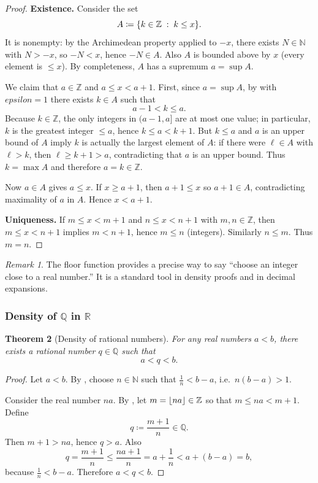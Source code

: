 \documentclass[12pt]{article}
\numberwithin{equation}{section}
\def\eps{epsilon}
\newcommand{\RR}{\mathbb{R}}
\newcommand{\QQ}{\mathbb{Q}}
\newcommand{\ZZ}{\mathbb{Z}}
\newcommand{\NN}{\mathbb{N}}
\DeclarePairedDelimiter{\set}{\{}{\}}
\DeclarePairedDelimiter{\floor}{\lfloor}{\rfloor}
\newcommand{\eps}{\varepsilon}               %
\newcommand{\st}{\;:\;}                      %
\theoremstyle{plain}
\newtheorem{theorem}{Theorem}[section]
\theoremstyle{definition}
\theoremstyle{remark}
\newtheorem{remark}[theorem]{Remark}
\begin{document}
\begin{proof}
\textbf{Existence.} Consider the set
\[
A \coloneqq \set*{k\in\ZZ \st k\le x}.
\]
It is nonempty: by the Archimedean property applied to $-x$, there exists $N\in\NN$ with $N>-x$, so $-N<x$, hence $-N\in A$.
Also $A$ is bounded above by $x$ (every element is $\le x$). By completeness, $A$ has a supremum $a=\sup A$.

We claim that $a\in\ZZ$ and $a\le x < a+1$. First, since $a=\sup A$, by  with $\eps=1$ there exists $k\in A$ such that
\[
a-1 < k \le a.
\]
Because $k\in\ZZ$, the only integers in $(a-1,a]$ are at most one value; in particular, $k$ is the greatest integer $\le a$, hence $k\le a<k+1$.
But $k\le a$ and $a$ is an upper bound of $A$ imply $k$ is actually the largest element of $A$:
if there were $\ell\in A$ with $\ell>k$, then $\ell\ge k+1>a$, contradicting that $a$ is an upper bound.
Thus $k=\max A$ and therefore $a=k\in\ZZ$.

Now $a\in A$ gives $a\le x$. If $x\ge a+1$, then $a+1\le x$ so $a+1\in A$, contradicting maximality of $a$ in $A$.
Hence $x<a+1$.

\textbf{Uniqueness.} If $m\le x<m+1$ and $n\le x<n+1$ with $m,n\in\ZZ$, then $m\le x<n+1$ implies $m<n+1$, hence $m\le n$ (integers).
Similarly $n\le m$. Thus $m=n$.
\end{proof}

\begin{remark}
The floor function provides a precise way to say “choose an integer close to a real number.” It is a standard tool in density proofs and in decimal expansions.
\end{remark}

\subsubsection{Density of $\QQ$ in $\RR$}

\begin{theorem}[Density of rational numbers]\label{thm:Q-dense}
For any real numbers $a<b$, there exists a rational number $q\in\QQ$ such that
\[
a<q<b.
\]
\end{theorem}

\begin{proof}
Let $a<b$. By , choose $n\in\NN$ such that $\frac{1}{n}<b-a$, i.e.\ $n(b-a)>1$.

Consider the real number $na$. By , let $m=\floor{na}\in\ZZ$ so that $m\le na < m+1$.
Define
\[
q \coloneqq \frac{m+1}{n}\in\QQ.
\]
Then $m+1>na$, hence $q>a$. Also
\[
q = \frac{m+1}{n} \le \frac{na+1}{n} = a+\frac{1}{n} < a+(b-a)=b,
\]
because $\frac{1}{n}<b-a$. Therefore $a<q<b$.
\end{proof}
\end{document}
